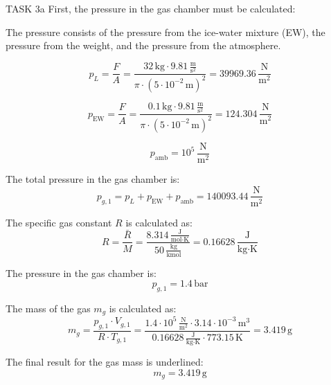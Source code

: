 TASK 3a  
First, the pressure in the gas chamber must be calculated:  

The pressure consists of the pressure from the ice-water mixture (EW), the pressure from the weight, and the pressure from the atmosphere.  

\[
p_L = \frac{F}{A} = \frac{32 \, \text{kg} \cdot 9.81 \, \frac{\text{m}}{\text{s}^2}}{\pi \cdot (5 \cdot 10^{-2} \, \text{m})^2} = 39969.36 \, \frac{\text{N}}{\text{m}^2}
\]  

\[
p_{\text{EW}} = \frac{F}{A} = \frac{0.1 \, \text{kg} \cdot 9.81 \, \frac{\text{m}}{\text{s}^2}}{\pi \cdot (5 \cdot 10^{-2} \, \text{m})^2} = 124.304 \, \frac{\text{N}}{\text{m}^2}
\]  

\[
p_{\text{amb}} = 10^5 \, \frac{\text{N}}{\text{m}^2}
\]  

The total pressure in the gas chamber is:  
\[
p_{g,1} = p_L + p_{\text{EW}} + p_{\text{amb}} = 140093.44 \, \frac{\text{N}}{\text{m}^2}
\]  

The specific gas constant \( R \) is calculated as:  
\[
R = \frac{\bar{R}}{M} = \frac{8.314 \, \frac{\text{J}}{\text{mol·K}}}{50 \, \frac{\text{kg}}{\text{kmol}}} = 0.16628 \, \frac{\text{J}}{\text{kg·K}}
\]  

The pressure in the gas chamber is:  
\[
p_{g,1} = 1.4 \, \text{bar}
\]  

The mass of the gas \( m_g \) is calculated as:  
\[
m_g = \frac{p_{g,1} \cdot V_{g,1}}{R \cdot T_{g,1}} = \frac{1.4 \cdot 10^5 \, \frac{\text{N}}{\text{m}^2} \cdot 3.14 \cdot 10^{-3} \, \text{m}^3}{0.16628 \, \frac{\text{J}}{\text{kg·K}} \cdot 773.15 \, \text{K}} = 3.419 \, \text{g}
\]  

The final result for the gas mass is underlined:  
\[
m_g = 3.419 \, \text{g}
\]  
